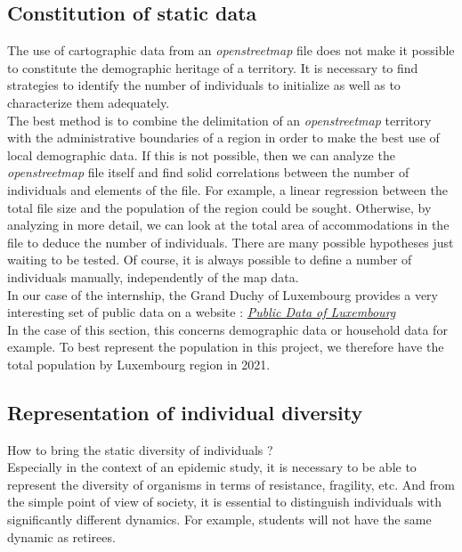 \subsection{Constitution of static data}

The use of cartographic data from an \textit{openstreetmap} file does not make it possible to constitute the demographic heritage of a territory. It is necessary to find strategies to identify the number of individuals to initialize as well as to characterize them adequately.\\

The best method is to combine the delimitation of an \textit{openstreetmap} territory with the administrative boundaries of a region in order to make the best use of local demographic data. If this is not possible, then we can analyze the \textit{openstreetmap} file itself and find solid correlations between the number of individuals and elements of the file. For example, a linear regression between the total file size and the population of the region could be sought. Otherwise, by analyzing in more detail, we can look at the total area of accommodations in the file to deduce the number of individuals. There are many possible hypotheses just waiting to be tested. Of course, it is always possible to define a number of individuals manually, independently of the map data.\\

In our case of the internship, the Grand Duchy of Luxembourg provides a very interesting set of public data on a website : 
\href{https://data.public.lu/fr/ }{\textit{Public Data of Luxembourg}}\\


In the case of this section, this concerns demographic data or household data for example. To best represent the population in this project, we therefore have the total population by Luxembourg region in 2021.\\

\subsection{Representation of individual diversity}

How to bring the static diversity of individuals ?\\

Especially in the context of an epidemic study, it is necessary to be able to represent the diversity of organisms in terms of resistance, fragility, etc. And from the simple point of view of society, it is essential to distinguish individuals with significantly different dynamics. For example, students will not have the same dynamic as retirees.\\

